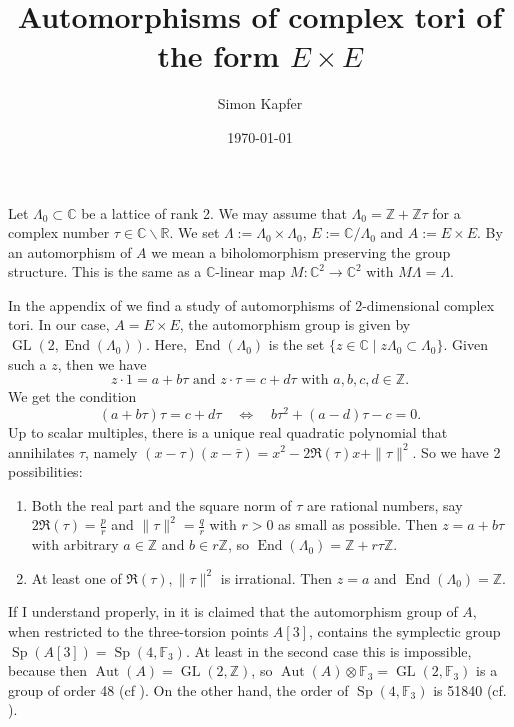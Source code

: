 \documentclass{amsart}
\DeclareMathOperator{\Aut}{Aut}
\DeclareMathOperator{\Sp}{Sp}
\DeclareMathOperator{\GL}{GL}
\DeclareMathOperator{\End}{End}
\newcommand{\C}{\mathbb{C}}
\newcommand{\R}{\mathbb{R}}
\newcommand{\Z}{\mathbb{Z}}
\newcommand{\F}{{\mathbb{ F }_3}}
\theoremstyle{plain}
\theoremstyle{definition}
\theoremstyle{remark}
\begin{document}
\title{Automorphisms of complex tori of the form $E\times E$}

\author{Simon Kapfer}

\date{\today}


\maketitle

Let $\Lambda_0 \subset \C$ be a lattice of rank 2. We may assume that $\Lambda_0 =\Z +\Z\tau$ for a complex number $\tau\in\C\backslash\R$. We set $\Lambda:= \Lambda_0\times\Lambda_0$, $E:=\C/\Lambda_0$ and $A:= E\times E$. By an automorphism of $A$ we mean a biholomorphism preserving the group structure. This is the same as a $\C$-linear map $ M:\C^2 \rightarrow \C^2$ with $M\Lambda =\Lambda$. 

In the appendix of \cite{Ghys} we find a study of automorphisms of 2-dimensional complex tori. In our case, $A=E\times E$, the automorphism group is given by $\GL(2,\End(\Lambda_0))$.
Here, $\End(\Lambda_0)$ is the set $\{z\in\C \;|\; z\Lambda_0\subset \Lambda_0\}$. Given such a $z$, then we have $$z\cdot 1 = a + b\tau\text{ and }z\cdot \tau = c+ d\tau\text{ with }a,b,c,d\in \Z.$$ 
We get the condition
$$
(a+b\tau)\tau = c+d\tau\quad \Leftrightarrow \quad b\tau^2 + (a-d)\tau -c =0.
$$
Up to scalar multiples, there is a unique real quadratic polynomial that annihilates $\tau$, namely $ (x -\tau )(x-\bar{\tau})=x^2 - 2\Re(\tau)x+ \|\tau\|^2$. So we have 2 possibilities:
\begin{enumerate}
 \item Both the real part and the square norm of $\tau$ are rational numbers, say $2\Re(\tau) = \frac{p}{r}$ and $\|\tau\|^2 = \frac{q}{r}$ with $r>0$ as small as possible. Then $z=a+b\tau$ with arbitrary $a\in \Z$ and $b\in r\Z$, so $\End(\Lambda_0)= \Z+ r\tau\Z$.
 \item At least one of $\Re(\tau), \|\tau\|^2$ is irrational. Then $z=a $ and $\End(\Lambda_0)=\Z$.
\end{enumerate}
\vspace{0.5cm}


If I understand properly, in \cite[proof of Prop.~5.2]{Hassett} it is claimed that the automorphism group of $A$, when restricted to the three-torsion points $A[3]$, contains the symplectic group $\Sp (A[3])=\Sp (4,\F )$. At least in the second case this is impossible, because then $\Aut(A) =\GL(2,\Z)$, so $\Aut(A)\otimes\F =\GL(2,\F)$ is a group of order 48 (cf \cite{GL}). On the other hand, the order of $\Sp(4,\F)$ is 51840 (cf. \cite{Sp}).
\end{document}

